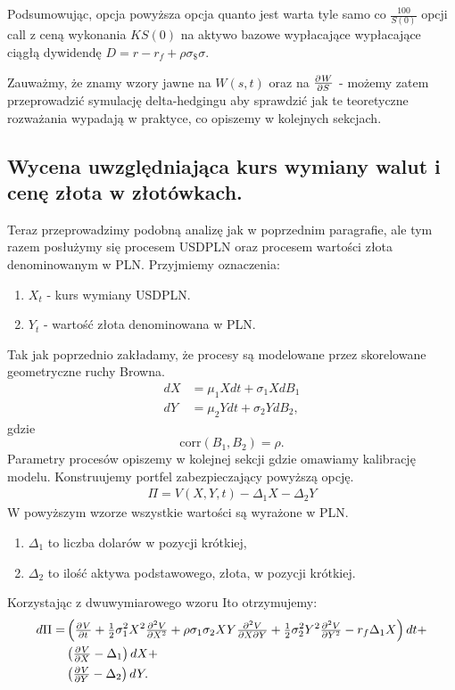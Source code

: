 \documentclass[12pt]{article}
\newcommand{\corr}{\mathrm{corr}}
\providecommand{\pd}[3][]{\ensuremath{
\ifinner
\tfrac{\partial{^{#1}}#2}{\partial{#3^{#1}}}
\else
\dfrac{\partial{^{#1}}#2}{\partial{#3^{#1}}}
\fi
}}
\begin{document}
 Podsumowując, opcja powyższa opcja quanto jest warta tyle samo co $\tfrac{100}{S(0)}$ opcji call z ceną wykonania $KS(0)$ na aktywo bazowe wypłacające wypłacające ciągłą dywidendę $D = r - r_f +\rho \sigma_\$ \sigma$.  
 \newline
 
 Zauważmy, że znamy wzory jawne na $W(s, t)$ oraz na $\pd{W}{S}$ - możemy zatem przeprowadzić symulację delta-hedgingu aby sprawdzić jak te teoretyczne rozważania wypadają w praktyce, co opiszemy w kolejnych sekcjach.
 

\subsection{Wycena uwzględniająca kurs wymiany walut i cenę złota w złotówkach.}
\label{Wariant 2}

Teraz przeprowadzimy podobną analizę jak w poprzednim paragrafie, ale tym razem posłużymy się procesem USDPLN oraz procesem wartości złota denominowanym w PLN. Przyjmiemy oznaczenia:
\begin{enumerate}
    \item $X_t$ - kurs wymiany USDPLN.
    \item $Y_t$ - wartość złota denominowana w PLN.
\end{enumerate}
Tak jak poprzednio zakładamy, że procesy są modelowane przez skorelowane geometryczne ruchy Browna.
\begin{align*}
dX &= \mu_1 X dt + \sigma_1 X dB_1 \\
dY &= \mu_2 Y dt + \sigma_2 Y dB_2,
\end{align*}
gdzie 
$$
    \corr(B_1, B_2) = \rho.
$$
Parametry procesów opiszemy w kolejnej sekcji gdzie omawiamy kalibrację modelu.
\newline
Konstruujemy portfel zabezpieczający powyższą opcję. 
\begin{align*}
\Pi = V(X, Y, t) - \Delta_1 X - \Delta_2 Y    
\end{align*}
W powyższym wzorze wszystkie wartości są wyrażone w PLN. 
\begin{enumerate}
    \item $\Delta_1 $ to liczba dolarów w pozycji krótkiej,
    \item $\Delta_2 $ to ilość aktywa podstawowego, złota, w pozycji krótkiej.
\end{enumerate}
Korzystając z dwuwymiarowego wzoru Ito otrzymujemy:
\begin{align*}
    d\Pi =  &\left( \pd{V}{t} + \tfrac{1}{2} \sigma_1^2 X^2 \pd[2]{V}{X}  + \rho \sigma_1 \sigma_2 X Y \tfrac{\partial^2 V}{\partial X\partial Y} + \tfrac{1}{2} \sigma_2^2 Y^2 \pd[2]{V}{Y} - r_f \Delta_1 X \right) dt + \\
            &\left( \pd{V}{X} - \Delta_1 \right) dX + \\
            &\left( \pd{V}{Y} - \Delta_2 \right) dY.
\end{align*}
\end{document}
